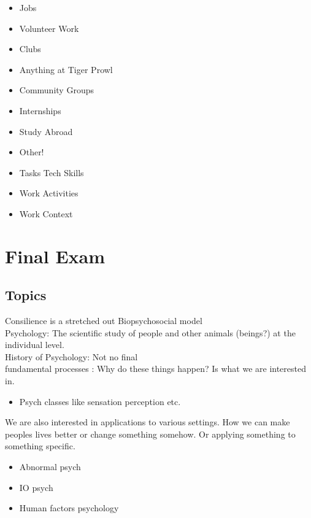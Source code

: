 \documentclass{report}
\begin{document}

{
    \begin{itemize}
        \item Jobs
        \item Volunteer Work
        \item Clubs
        \item Anything at Tiger Prowl
        \item Community Groups
        \item Internships
        \item Study Abroad
        \item Other!
    \end{itemize}
}


{
\begin{itemize}
    \item Tasks Tech Skills
    \item Work Activities 
    \item Work Context
\end{itemize}
}

\chapter{Final Exam}

\section{Topics}
Consilience is a stretched out Biopsychosocial model \\
Psychology: The scientific study of people and other animals (beings?) at the individual level. \\ 
History of Psychology: Not no final \\ 
fundamental processes : Why do these things happen? Is what we are interested in. 
\begin{itemize}
    \item Psych classes like sensation perception etc.
\end{itemize}
We are also interested in applications to various settings. How we can make peoples lives better or change something somehow. Or applying something to something specific. 
\begin{itemize}
    \item Abnormal psych
    \item IO psych 
    \item Human factors psychology 
\end{itemize}
\end{document}
